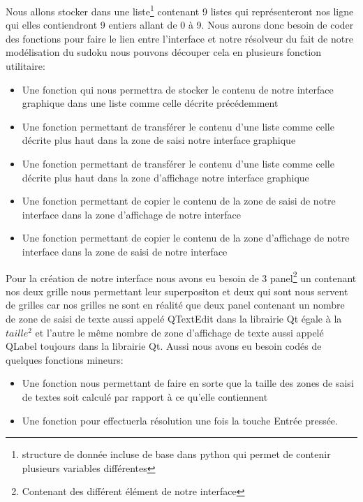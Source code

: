 Nous allons stocker dans une liste\footnote{\label{liste_Python}structure de donnée incluse de base dans python qui permet de contenir plusieurs variables différentes} contenant 9 listes qui représenteront nos ligne qui elles contiendront 9 entiers allant de 0 à 9. Nous aurons donc besoin de coder des fonctions pour faire le lien entre l'interface et notre résolveur du fait de notre modélisation du sudoku nous pouvons découper cela en plusieurs fonction utilitaire:\newline
\begin{itemize}
\item Une fonction qui nous permettra de stocker le contenu de notre interface graphique dans une liste comme celle décrite précédemment
\item Une fonction permettant de transférer le contenu d'une liste comme celle décrite plus haut dans la zone de saisi notre interface graphique
\item Une fonction permettant de transférer le contenu d'une liste comme celle décrite plus haut dans la zone d'affichage notre interface graphique
\item Une fonction permettant de copier le contenu de la zone de saisi de notre interface dans la zone d'affichage de notre interface
\item Une fonction permettant de copier le contenu de la zone d'affichage de notre interface dans la zone de saisi de notre interface
\end{itemize}

Pour la création de notre interface nous avons eu besoin de 3 panel\footnote{Contenant des différent élément de notre interface} un contenant nos deux grille nous permettant leur superpositon et deux qui sont nous servent de grilles car nos grilles ne sont en réalité que deux panel contenant un nombre de zone de saisi de texte aussi appelé QTextEdit dans la librairie Qt égale à la $taille^{2}$ et l'autre le même nombre de zone d'affichage de texte aussi appelé QLabel toujours dans la librairie Qt. Aussi nous avons eu besoin codés de quelques fonctions mineurs:\newline

\begin{itemize}
\item Une fonction nous permettant de faire en sorte que la taille des zones de saisi de textes soit calculé par rapport à ce qu'elle contiennent
\item Une fonction pour effectuerla résolution une fois la touche Entrée pressée.
\end{itemize}

